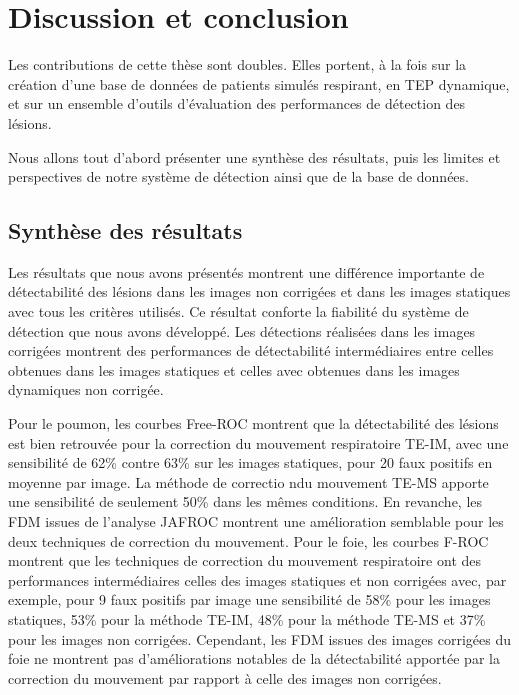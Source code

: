 \chapter{Discussion et conclusion}

Les contributions de cette thèse sont doubles. Elles portent, à la fois sur la
création d'une base de données de patients simulés respirant, en TEP dynamique, et
sur un ensemble d'outils d'évaluation des performances de détection
des lésions.  
 
Nous allons tout d'abord présenter une synthèse des résultats, puis les limites et perspectives de notre système de détection ainsi que de la base de données.

\section{Synthèse des résultats}

Les résultats que nous avons présentés montrent une différence importante de
détectabilité des lésions dans les images non corrigées et dans les images statiques
avec tous les critères utilisés. Ce résultat conforte la fiabilité du système de
détection que nous avons développé. Les détections réalisées dans les images
corrigées montrent des performances de détectabilité intermédiaires entre celles obtenues dans les images statiques et celles avec obtenues dans les images dynamiques non corrigée. 

Pour le poumon, les courbes Free-ROC montrent que la détectabilité des
lésions est bien retrouvée pour la correction du mouvement respiratoire TE-IM, avec une sensibilité de 62\% contre 63\% sur les images statiques, pour
20 faux positifs en moyenne par image. La méthode de correctio ndu mouvement TE-MS apporte une sensibilité de seulement 50\% dans les mêmes conditions. En revanche, les FDM
issues de l'analyse JAFROC montrent une amélioration semblable pour
les deux techniques de correction du mouvement. Pour le foie, les courbes F-ROC
montrent que les techniques de correction du mouvement respiratoire ont des performances intermédiaires celles des images statiques et non
corrigées avec, par exemple, pour 9 faux positifs par image une sensibilité de
58\% pour les images statiques, 53\% pour la méthode TE-IM, 48\% pour la méthode TE-MS et 37\% pour
les images non corrigées. Cependant, les FDM issues des images corrigées du foie
ne montrent pas d'améliorations notables de la détectabilité apportée par la
correction du mouvement par rapport à celle des images non corrigées. 

